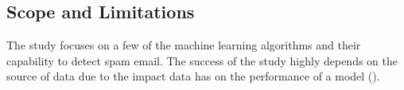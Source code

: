 \subsection{Scope and Limitations}
The study focuses on a few of the machine learning algorithms and their capability to detect spam email. The success of the study highly depends on the source of data due to the impact data has on the performance of a model (\cite{ragab_sharkas_marshall_ren_2019}).